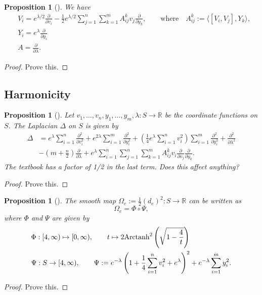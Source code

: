 \documentclass{amsart}[]
\newcommand{\R}{\mathbb R}
\newcommand{\alert}[1]{\color{red}#1\color{black}}
\newcommand{\arctanh}{\text{\normalfont Arctanh}}
\theoremstyle{plain}
\newtheorem{proposition}[theorem]{Proposition}
\theoremstyle{definition}
\theoremstyle{remark}
\begin{document}
	\begin{proposition}[{\cite[Section 4.1.5]{tricerri}}]
		\label{coordinates}
		We have 
		\begin{align*}
			&V_i = e^{\lambda/2} \frac{\partial}{\partial v_i} - \frac12 e^{\lambda/2} \sum_{j=1}^n \sum_{k=1}^m A^k_{ij} v_j \frac{\partial}{\partial y_k}, \qquad \text{where} \quad A_{ij}^k := \langle [V_i, V_j], Y_k\rangle,\\
			& Y_i = e^\lambda \frac{\partial}{\partial y_i} \\
			& A = \frac{\partial}{\partial \lambda}.
		\end{align*}
	\end{proposition}
	\begin{proof}
		\alert{Prove this.}
	\end{proof}

	\subsection{Harmonicity}
	\begin{proposition}[{\cite[Section 4.4]{tricerri}}]
		Let $v_1,\ldots,v_n,y_1,\ldots,y_m,\lambda:S \rightarrow \R$ be the coordinate functions on $S$. The Laplacian $\Delta$ on $S$ is given by 
		\begin{align*}
			\Delta &= e^\lambda \sum_{i=1}^n \frac{\partial^2}{\partial v_i^2} + e^{2\lambda } \sum_{i=1}^m\frac{\partial^2}{\partial y_i^2}  +\left(  \frac14 e^\lambda \sum_{i=1}^n v_i^2\right) \sum_{i=1}^m \frac{\partial^2}{\partial y_i^2} + \frac{\partial^2}{\partial \lambda^2} \\
			& - \left(m+ \frac n2 \right) \frac{\partial}{\partial \lambda}  +  e^\lambda \sum_{i=1}^n \sum_{j=1}^n \sum_{k=1}^m  A^k_{ij}v_i \frac{\partial}{\partial v_j} \frac{\partial }{\partial y_k}.
		\end{align*}
		\alert{The textbook has a factor of 1/2 in the last term. Does this affect anything?}
	\end{proposition}
	\begin{proof}
		\alert{Prove this.}
	\end{proof}



	\begin{proposition}[{\cite[Section 4.4]{tricerri}}]
		The smooth map $\Omega_e := \frac12 (d_e)^2:S \rightarrow \R$ can be written as 
		$$\Omega_e = \Phi \circ \Psi,$$
		where $\Phi$ and $\Psi$ are given by 
		\begin{align*}
			&\Phi:[4, \infty) \mapsto [0,\infty), \qquad t \mapsto 2 \arctanh^2 \left( \sqrt{1 - \frac4t}\right) \\
			&\Psi:S \rightarrow [4,\infty), \qquad \Psi := e^{-\lambda}\left( 1 + \frac14  \sum_{i=1}^n v_i^2 + e^\lambda\right)^2 + e^{-\lambda}\sum_{i=1}^m y_i^2.
		\end{align*}
	\end{proposition}
	\begin{proof}
		\alert{Prove this.}
	\end{proof}
\end{document}
